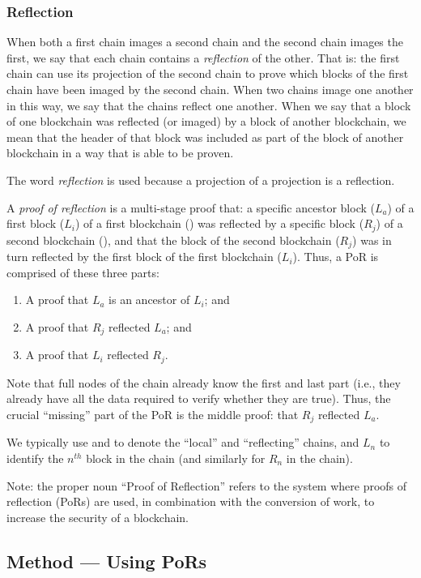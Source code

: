 \documentclass[a4paper,]{article}
\begin{document}
\subsubsection{Reflection}

When both a first chain images a second chain and the second chain images the first, we say that each chain contains a \emph{reflection} of the other.
That is: the first chain can use its projection of the second chain to prove which blocks of the first chain have been imaged by the second chain.
When two chains image one another in this way, we say that the chains reflect one another.
When we say that a block of one blockchain was reflected (or imaged) by a block of another blockchain, we mean that the header of that block was included as part of the block of another blockchain in a way that is able to be proven.

The word \emph{reflection} is used because a projection of a projection is a reflection.

A \emph{proof of reflection} is a multi-stage proof that: a specific ancestor block ($L_a$) of a first block ($L_i$) of a first blockchain (\cL) was reflected by a specific block ($R_j$) of a second blockchain (\cR), and that the block of the second blockchain ($R_j$) was in turn reflected by the first block of the first blockchain ($L_i$).
Thus, a PoR is comprised of these three parts:
\begin{enumerate}
  \item A proof that $L_a$ is an ancestor of $L_i$; and
  \item A proof that $R_j$ reflected $L_a$; and
  \item A proof that $L_i$ reflected $R_j$.
\end{enumerate}

Note that full nodes of the \cL chain already know the first and last part (i.e., they already have all the data required to verify whether they are true).
Thus, the crucial ``missing'' part of the PoR is the middle proof: that $R_j$ reflected $L_a$.

We typically use \cL and \cR to denote the ``local'' and ``reflecting'' chains, and $L_n$ to identify the $n^{th}$ block in the \cL chain (and similarly for $R_n$ in the \cR chain).

Note: the proper noun ``Proof of Reflection'' refers to the system where proofs of reflection (PoRs) are used, in combination with the conversion of work, to increase the security of a blockchain.

\subsection{Method --- Using PoRs}
\end{document}
